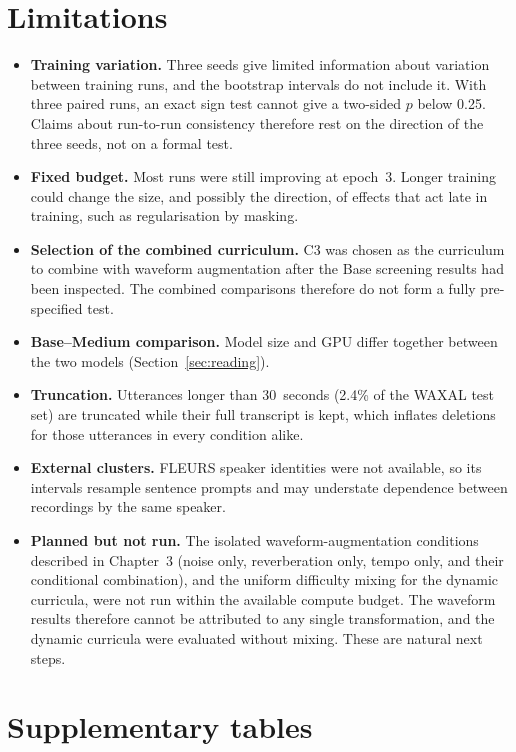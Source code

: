 \documentclass[12pt,a4paper]{report}
\begin{document}
\section{Limitations}
\label{sec:limitations}

\begin{itemize}
\item \textbf{Training variation.} Three seeds give limited information about
variation between training runs, and the bootstrap intervals do not include it.
With three paired runs, an exact sign test cannot give a two-sided $p$ below
0.25. Claims about run-to-run consistency therefore rest on the direction of
the three seeds, not on a formal test.
\item \textbf{Fixed budget.} Most runs were still improving at epoch~3. Longer
training could change the size, and possibly the direction, of effects that
act late in training, such as regularisation by masking.
\item \textbf{Selection of the combined curriculum.} C3 was chosen as the
curriculum to combine with waveform augmentation after the Base screening
results had been inspected. The combined comparisons therefore do not form a
fully pre-specified test.
\item \textbf{Base--Medium comparison.} Model size and GPU differ together
between the two models (Section~\ref{sec:reading}).
\item \textbf{Truncation.} Utterances longer than 30~seconds (2.4\% of the WAXAL
test set) are truncated while their full transcript is kept, which inflates
deletions for those utterances in every condition alike.
\item \textbf{External clusters.} FLEURS speaker identities were not available,
so its intervals resample sentence prompts and may understate dependence
between recordings by the same speaker.
\item \textbf{Planned but not run.} The isolated waveform-augmentation
conditions described in Chapter~3 (noise only, reverberation only, tempo only,
and their conditional combination), and the uniform difficulty mixing for the
dynamic curricula, were not run within the available compute budget. The
waveform results therefore cannot be attributed to any single transformation,
and the dynamic curricula were evaluated without mixing. These are natural
next steps.
\end{itemize}

\appendix
\renewcommand{\thesection}{\thechapter.\Alph{section}}
\section{Supplementary tables}
\end{document}
